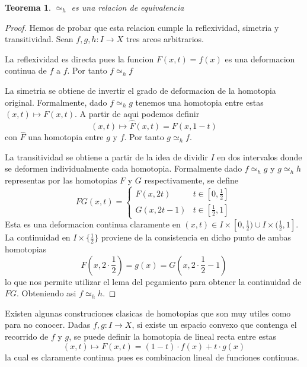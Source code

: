 \documentclass[letterpaper]{article}
\theoremstyle{definition}
\theoremstyle{plain}
\newtheorem{teorema}{Teorema}
\begin{document}
\begin{teorema}
  \(\simeq_h\) es una relacion de equivalencia
\end{teorema}
\begin{proof}
  Hemos de probar que esta relacion cumple la reflexividad, simetria y
  transitividad. Sean \(f,g,h : I \to X\) tres arcos arbitrarios.

  La reflexividad es directa pues la funcion \(F(x,t) = f(x)\) es una
  deformacion continua de \(f\) a \(f\). Por tanto \(f \simeq_h f\)

  La simetria se obtiene de invertir el grado de deformacion de la
  homotopia original. Formalmente, dado \(f \simeq_h g\) tenemos una
  homotopia entre estas \((x,t) \mapsto F(x,t)\). A partir de aqui
  podemos definir
  \[ (x,t) \mapsto \hat{F}(x,t) = F(x,1-t)\]
  con \(\hat{F}\) una homotopia entre \(g\) y \(f\). Por tanto \(g
  \simeq_h f\).

  La transitividad se obtiene a partir de la idea de dividir \(I\) en dos
  intervalos donde se deformen individualmente cada homotopia.
  Formalmente dado \(f \simeq_h g\) y \(g \simeq_h h\) representas por
  las homotopias \(F\) y \(G\) respectivamente, se define
  \[ FG(x,t) = \begin{cases}
                 F(x,2t) & t \in [0,\frac{1}{2}] \\
                 G(x,2t - 1) & t \in [ \frac{1}{2} , 1]
               \end{cases}
  \]
  Esta es una deformacion continua claramente en \((x,t) \in I \times [0,
  \frac{1}{2}) \cup I \times (\frac{1}{2}, 1]\). La continuidad en \(I
  \times \{\frac{1}{2}\}\) proviene de la consistencia en dicho punto de
  ambas homotopias
  \[ F(x,2 \cdot \frac{1}{2}) = g(x) = G(x, 2 \cdot \frac{1}{2} - 1)\]
  lo que nos permite utilizar el lema del pegamiento para obtener la
  continuidad de \(FG\). Obteniendo asi \(f \simeq_h h\).
\end{proof}
Existen algunas construciones clasicas de homotopias que son muy utiles
como para no conocer. Dadas \(f,g : I \to X\), si existe un espacio
convexo que contenga el recorrido de \(f\) y \(g\), se puede definir la
homotopia de lineal recta entre estas
\[ (x,t) \mapsto F(x,t) = (1-t) \cdot f(x) + t \cdot g(x) \]
la cual es claramente continua pues es combinacion lineal de funciones continuas.
\end{document}
